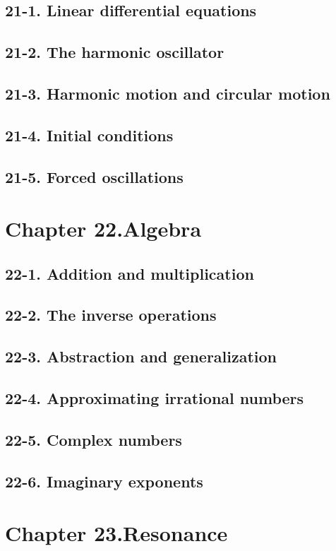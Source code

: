 \documentclass{article}
\begin{document}
\subsection{21-1. Linear differential equations}
\subsection{21-2. The harmonic oscillator}
\subsection{21-3. Harmonic motion and circular motion}
\subsection{21-4. Initial conditions}
\subsection{21-5. Forced oscillations}
\section{Chapter 22.Algebra}
\subsection{22-1. Addition and multiplication}
\subsection{22-2. The inverse operations}
\subsection{22-3. Abstraction and generalization}
\subsection{22-4. Approximating irrational numbers}
\subsection{22-5. Complex numbers}
\subsection{22-6. Imaginary exponents}
\section{Chapter 23.Resonance}
\end{document}
